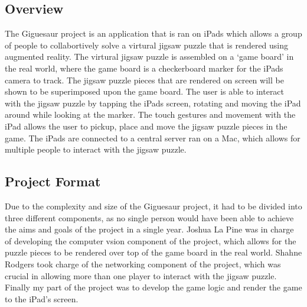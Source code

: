 \documentclass{article}
\begin{document}
\subsection{Overview}
The Giguesaur project is an application that is ran on iPads which allows a
group of people to collabortively solve a virtural jigsaw puzzle that is
rendered using augmented reality. The virtural jigsaw puzzle is assembled on a
`game board' in the real world, where the game board is a checkerboard marker
for the iPads camera to track. The jigsaw puzzle pieces that are rendered on
screen will be shown to be superimposed upon the game board. The user is able to
interact with the jigsaw puzzle by tapping the iPads screen, rotating and moving
the iPad around while looking at the marker. The touch gestures and movement with
the iPad allows the user to pickup, place and move the jigsaw puzzle pieces in
the game. The iPads are connected to a central server ran on a Mac, which allows
for multiple people to interact with the jigsaw puzzle.

\subsection{Project Format}
Due to the complexity and size of the Giguesaur project, it had to be
divided into three different components, as no single person would have been
able to achieve the aims and goals of the project in a single year. Joshua La
Pine was in charge of developing the computer vsion component of the project,
which allows for the puzzle pieces to be rendered over top of the game board in
the real world. Shahne Rodgers took charge of the networking component of the
project, which was crucial in allowing more than one player to interact with the
jigsaw puzzle. Finally my part of the project was to develop the game logic and
render the game to the iPad's screen.

\end{document}
